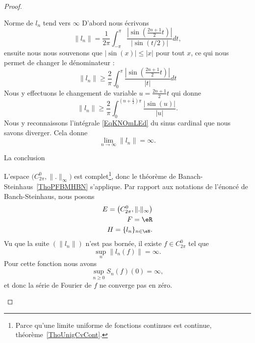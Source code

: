 \begin{proof}
\begin{subproof}
        \item[Norme de \( l_n\) tend vers \( \infty\)]
            D'abord nous écrivons
            \begin{equation}
                \| l_n \|=\frac{1}{ 2\pi }\int_{-\pi}^{\pi}\frac{ \left| \sin\left( \frac{ 2n+1 }{2}t \right) \right|  }{ \big| \sin(t/2) \big| }dt,
            \end{equation}
            ensuite nous nous souvenons que \( | \sin(x) |\leq | x |\) pour tout \( x\), ce qui nous permet de changer le dénominateur :
            \begin{equation}
                \| l_n \|\geq \frac{ 2 }{ \pi }\int_0^{\pi}\frac{ \left| \sin\left( \frac{ 2n+1 }{2}t \right) \right|  }{ | t | }dt
            \end{equation}
            Nous y effectuons le changement de variable \( u=\frac{ 2n+1 }{2}t\) qui donne
            \begin{equation}
                \| l_n \|\geq \frac{ 2 }{ \pi }\int_{0}^{(n+\frac{ 1 }{2})\pi}\frac{ \big| \sin(u) \big| }{ | u | }.
            \end{equation}
            Nous y reconnaissons l'intégrale \eqref{EqKNOmLEd} du sinus cardinal que nous savons diverger. Cela donne
            \begin{equation}
                \lim_{n\to \infty} \| l_n \|=\infty.
            \end{equation}
        \item[La conclusion]

            L'espace \( \big( C^0_{2\pi},\| . \|_{\infty} \big)\) est complet\footnote{Parce qu'une limite uniforme de fonctions continues est continue, théorème~\ref{ThoUnigCvCont}.}, donc le théorème de Banach-Steinhaus~\ref{ThoPFBMHBN} s'applique. Par rapport aux notations de l'énoncé de Banch-Steinhaus, nous posons
            \begin{subequations}
                \begin{align}
                    E=\big( C^0_{2\pi},\| . \|_{\infty} \big)\\
                    F=\eR\\
                    H=\{ l_n \}_{n\in \eN}.
                \end{align}
            \end{subequations}
            Vu que la suite \( (\| l_n \|)\) n'est pas bornée, il existe \( f\in C^0_{2\pi}\) tel que
            \begin{equation}
                \sup_n\| l_n(f) \|=\infty.
            \end{equation}
            Pour cette fonction nous avons
            \begin{equation}
                \sup_{n\geq 0}S_n(f)(0)=\infty,
            \end{equation}
            et donc la série de Fourier de \( f\) ne converge pas en zéro.

        \end{subproof}
\end{proof}

